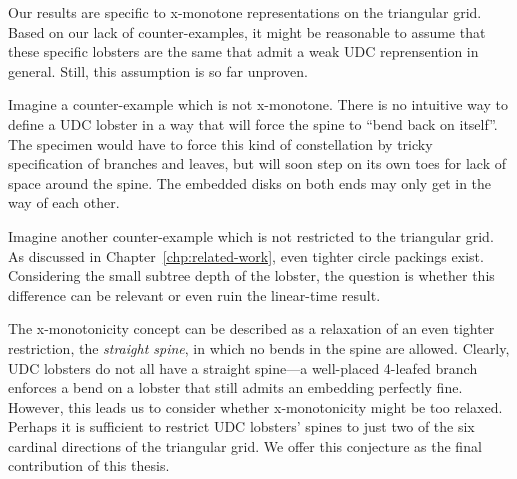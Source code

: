 Our results are specific to x-monotone representations on the triangular grid. Based on our lack of counter-examples, it might be reasonable to assume that these specific lobsters are the same that admit a weak UDC reprensention in general. Still, this assumption is so far unproven.

Imagine a counter-example which is not x-monotone. There is no intuitive way to define a UDC lobster in a way that will force the spine to ``bend back on itself''. The specimen would have to force this kind of constellation by tricky specification of branches and leaves, but will soon step on its own toes for lack of space around the spine. The embedded disks on both ends may only get in the way of each other.

Imagine another counter-example which is not restricted to the triangular grid. As discussed in Chapter~\ref{chp:related-work}, even tighter circle packings exist. Considering the small subtree depth of the lobster, the question is whether this difference can be relevant or even ruin the linear-time result.

The x-monotonicity concept can be described as a relaxation of an even tighter restriction, the \emph{straight spine}, in which no bends in the spine are allowed. Clearly, UDC lobsters do not all have a straight spine---a well-placed 4-leafed branch enforces a bend on a lobster that still admits an embedding perfectly fine. However, this leads us to consider whether x-monotonicity might be too relaxed. Perhaps it is sufficient to restrict UDC lobsters' spines to just two of the six cardinal directions of the triangular grid. We offer this conjecture as the final contribution of this thesis.

